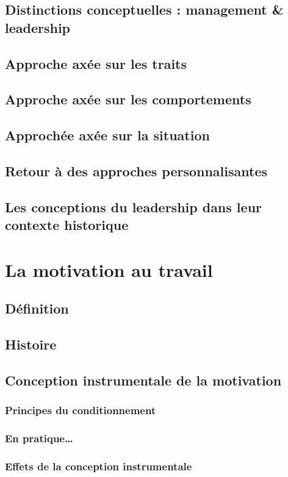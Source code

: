 \documentclass[12pt]{article}
\begin{document}
	\subsection{Distinctions conceptuelles : management \& leadership}
	\subsection{Approche axée sur les traits}
	\subsection{Approche axée sur les comportements}
	\subsection{Approchée axée sur la situation}
	\subsection{Retour à des approches personnalisantes}
	\subsection{Les conceptions du leadership dans leur contexte historique}

\section{La motivation au travail}
	\subsection{Définition}
	\subsection{Histoire}
	\subsection{Conception instrumentale de la motivation}
		\subsubsection{Principes du conditionnement}
		\subsubsection{En pratique…}
		\subsubsection{Effets de la conception instrumentale}
\end{document}
